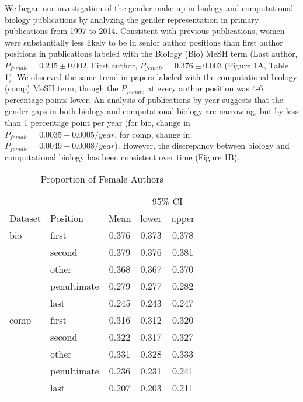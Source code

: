 \documentclass[10pt,letterpaper]{article}
\begin{document}
\begin{flushleft}
We began our investigation of the gender make-up in biology and computational biology publications by analyzing the gender representation in primary publications from 1997 to 2014. Consistent with previous publications, women were substantially less likely to be in senior author positions than first author positions in publications labeled with the Biology (Bio) MeSH term (Last author, $P_{female} = 0.245 \pm 0.002$, First author, $P_{female} = 0.376 \pm 0.003$ (Figure 1A, Table 1). We observed the same trend in papers labeled with the computational biology (comp) MeSH term, though the $P_{female}$ at every author position was 4-6  percentage points lower. An analysis of publications by year suggests that the gender gaps in both biology and computational biology are narrowing, but by less than 1 percentage point  per year (for bio, change in $P_{female} = 0.0035 \pm 0.0005 / year$, for comp, change in $P_{female} = 0.0049 \pm 0.0008 / year$). However, the discrepancy between biology and computational biology has been consistent over time (Figure 1B).

\begin{table}[]
\centering
\caption{Proportion of Female Authors}
\label{Table 1}
\begin{tabular}{llccc}
\toprule
        &               &       & \multicolumn{2}{c}{95\% CI} \\
\cmidrule(r){4-5}
Dataset & Position      & Mean  & lower        & upper        \\
\midrule
bio     & first         & 0.376 & 0.373        & 0.378        \\
        & second        & 0.379 & 0.376        & 0.381        \\
        & other         & 0.368 & 0.367        & 0.370        \\
        & penultimate   & 0.279 & 0.277        & 0.282        \\
        & last          & 0.245 & 0.243        & 0.247        \\
comp    & first         & 0.316 & 0.312        & 0.320        \\
        & second        & 0.322 & 0.317        & 0.327        \\
        & other         & 0.331 & 0.328        & 0.333        \\
        & penultimate   & 0.236 & 0.231        & 0.241        \\
        & last          & 0.207 & 0.203        & 0.211        \\
\bottomrule
\end{tabular}
\end{table}


\end{flushleft}
\end{document}
